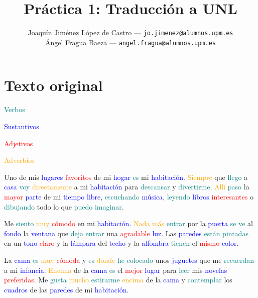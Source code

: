 \documentclass{article}
\title{Práctica 1: Traducción a UNL} %
\author{
        \normalsize Joaquín Jiménez López de Castro --- \small\texttt{jo.jimenez@alumnos.upm.es}\\
        \normalsize Ángel Fragua Baeza --- \small\texttt{angel.fragua@alumnos.upm.es}
}
\begin{document}
\maketitle

\thispagestyle{empty}

\newpage


\section{Texto original}

\textcolor{teal}{Verbos}

\textcolor{blue}{Sustantivos}

\textcolor{red}{Adjetivos}

\textcolor{orange}{Adverbios}

Uno de mis \textcolor{blue}{lugares} \textcolor{red}{favoritos} de mi \textcolor{blue}{hogar} \textcolor{teal}{es} mi \textcolor{blue}{habitación}. \textcolor{orange}{Siempre} que \textcolor{teal}{llego} a \textcolor{blue}{casa} \textcolor{teal}{voy} \textcolor{orange}{directamente} a mi \textcolor{blue}{habitación} para \textcolor{teal}{descansar} y \textcolor{teal}{divertirme}. \textcolor{orange}{Allí} \textcolor{teal}{paso} la \textcolor{red}{mayor} \textcolor{blue}{parte} de mi \textcolor{blue}{tiempo} \textcolor{blue}{libre}, \textcolor{teal}{escuchando} \textcolor{blue}{música}, \textcolor{teal}{leyendo} \textcolor{blue}{libros} \textcolor{red}{interesantes} o \textcolor{teal}{dibujando} todo lo que \textcolor{teal}{puedo imaginar}.

Me \textcolor{teal}{siento} \textcolor{orange}{muy} \textcolor{red}{cómodo} en mi \textcolor{blue}{habitación}. \textcolor{orange}{Nada más} \textcolor{teal}{entrar} por la \textcolor{blue}{puerta} \textcolor{teal}{se ve} al \textcolor{blue}{fondo} la \textcolor{blue}{ventana} que \textcolor{teal}{deja} \textcolor{teal}{entrar} una \textcolor{red}{agradable} \textcolor{blue}{luz}. Las \textcolor{blue}{paredes} \textcolor{teal}{están} \textcolor{teal}{pintadas} en un \textcolor{blue}{tono} \textcolor{red}{claro} y la \textcolor{blue}{lámpara} del \textcolor{blue}{techo} y la \textcolor{blue}{alfombra} \textcolor{teal}{tienen} el \textcolor{red}{mismo} \textcolor{blue}{color}.

La \textcolor{blue}{cama} \textcolor{teal}{es} \textcolor{orange}{muy} \textcolor{red}{cómoda} y \textcolor{teal}{es} \textcolor{orange}{donde} \textcolor{teal}{he colocado} unos \textcolor{blue}{juguetes} que me \textcolor{teal}{recuerdan} a mi \textcolor{blue}{infancia}. \textcolor{orange}{Encima} de la \textcolor{blue}{cama} \textcolor{teal}{es} el \textcolor{red}{mejor} \textcolor{blue}{lugar} para \textcolor{teal}{leer} mis \textcolor{blue}{novelas} \textcolor{red}{preferidas}. Me \textcolor{teal}{gusta} \textcolor{orange}{mucho} \textcolor{teal}{estirarme} \textcolor{orange}{encima} de la \textcolor{blue}{cama} y \textcolor{teal}{contemplar} los \textcolor{blue}{cuadros} de las \textcolor{blue}{paredes} de mi \textcolor{blue}{habitación}.
\end{document}
